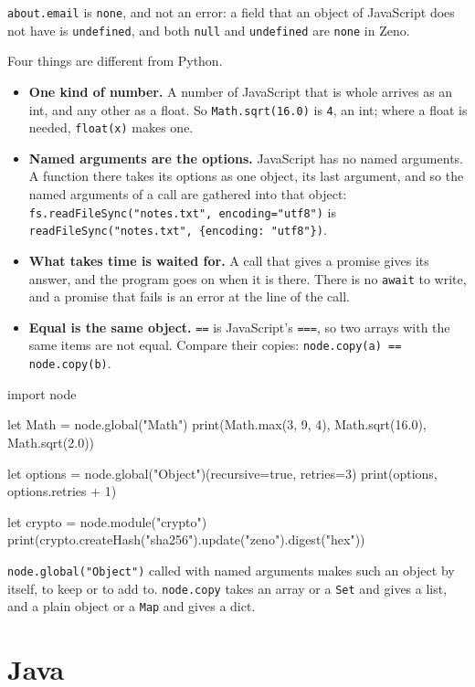 \verb|about.email| is \verb|none|, and not an error: a field that an
object of JavaScript does not have is \verb|undefined|, and both
\verb|null| and \verb|undefined| are \verb|none| in Zeno.

Four things are different from Python.

\begin{itemize}
\item \textbf{One kind of number.} A number of JavaScript that is
  whole arrives as an int, and any other as a float. So
  \verb|Math.sqrt(16.0)| is \verb|4|, an int; where a float is
  needed, \verb|float(x)| makes one.
\item \textbf{Named arguments are the options.} JavaScript has no
  named arguments. A function there takes its options as one object,
  its last argument, and so the named arguments of a call are gathered
  into that object: \verb|fs.readFileSync("notes.txt", encoding="utf8")|
  is \verb|readFileSync("notes.txt", {encoding: "utf8"})|.
\item \textbf{What takes time is waited for.} A call that gives a
  promise gives its answer, and the program goes on when it is there.
  There is no \verb|await| to write, and a promise that fails is an
  error at the line of the call.
\item \textbf{Equal is the same object.} \verb|==| is JavaScript's
  \verb|===|, so two arrays with the same items are not equal. Compare
  their copies: \verb|node.copy(a) == node.copy(b)|.
\end{itemize}

\begin{zeno}[file=waited.zeno]
import node

let Math = node.global("Math")
print(Math.max(3, 9, 4), Math.sqrt(16.0), Math.sqrt(2.0))

let options = node.global("Object")(recursive=true, retries=3)
print(options, options.retries + 1)

let crypto = node.module("crypto")
print(crypto.createHash("sha256").update("zeno").digest("hex"))
\end{zeno}

\verb|node.global("Object")| called with named arguments makes such an
object by itself, to keep or to add to. \verb|node.copy| takes an
array or a \verb|Set| and gives a list, and a plain object or a
\verb|Map| and gives a dict.

\section{Java}

